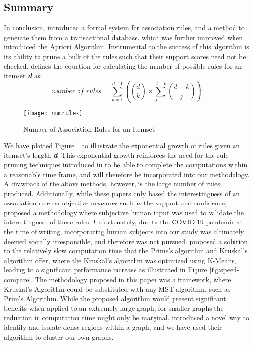 \subsection{Summary}
In conclusion,  introduced a formal system for association rules, and a method to generate them from a transactional database, which was further improved when  introduced the Apriori Algorithm.
Instrumental to the success of this algorithm is its ability to prune a bulk of the rules such that their support scores need not be checked.  defines the equation for calculating the number of possible rules for an itemset \textbf{\textit{d}} as:
\[
\textit{number of rules} = \sum\limits_{k=1}^{d-1} \left(\binom{d}{k} \times \sum\limits_{j=1}^{d-k}\binom{d-k}{j}  \right)
\]
\begin{figure}[H]
\centering
\texttt{[image: numrules]}
\caption{Number of Association Rules for an Itemset}
\label{fig:numrules}
\end{figure}
We have plotted Figure \ref{fig:numrules} to illustrate the exponential growth of rules given an itemset's length \textbf{\textit{d}}.
This exponential growth reinforces the need for the rule pruning techniques introduced in  to be able to complete the computations within a reasonable time frame, and will therefore be incorporated into our methodology.
A drawback of the above methods, however, is the large number of rules produced. Additionally, while these papers only based the interestingness of an association rule on objective measures such as the support and confidence,  proposed a methodology where subjective human input was used to validate the interestingness of these rules. Unfortunately, due to the COVID-19 pandemic at the time of writing, incorporating human subjects into our study was ultimately deemed socially irresponsible, and therefore was not pursued.
 proposed a solution to the relatively slow computation time that the Prims's algorithm and Kruskal's algorithm offer, where the Kruskal's algorithm was optimized using K-Means, leading to a significant performance increase as illustrated in Figure \ref{fig:speed-compare}. The methodology proposed in this paper was a framework, where Kruskal's Algorithm could be substituted with any MST algorithm, such as Prim's Algorithm. While the proposed algorithm would present significant benefits when applied to an extremely large graph, for smaller graphs the reduction in computation time might only be marginal.
 introduced a novel way to identify and isolate dense regions within a graph, and we have used their algorithm to cluster our own graphs.
